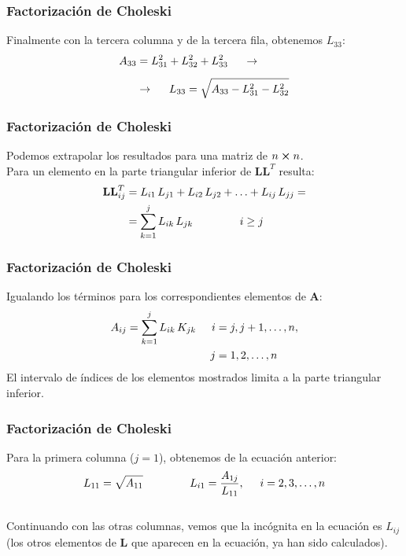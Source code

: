 \begin{frame}
\frametitle{Factorización de Choleski}
Finalmente con la tercera columna y de la tercera fila, obtenemos $L_{33}$:
\begin{align*}
A_{33} &= L_{31}^{2} + L_{32}^{2} + L_{33}^{2} \hspace{0.5cm} \rightarrow \\[0.5em]
&\rightarrow \hspace{0.5cm} L_{33} =\sqrt{A_{33} - L_{31}^{2} - L_{32}^{2}}
\end{align*}
\end{frame}
\begin{frame}
\frametitle{Factorización de Choleski}
Podemos extrapolar los resultados para una matriz de $n \cp n$.
\\
\bigskip
\pause
Para un elemento en la parte triangular inferior de $\mathbf{LL}^{T}$ resulta:
\begin{align*}
\mathbf{LL}^{T}_{ij} &= L_{i1} \, L_{j1} + L_{i2} \, L_{j2} + \ldots + L_{ij} \, L_{jj} = \\
&= \sum_{k=1}^{j} L_{ik}\, L_{jk} \hspace{1.5cm} i \geq j
\end{align*}
\end{frame}
\begin{frame}
\frametitle{Factorización de Choleski}
Igualando los términos para los correspondientes elementos de $\mathbf{A}$:
\begin{align*}
A_{ij} = \sum_{k=1}^{j} L_{ik} \, K_{jk} \hspace{0.5cm} i &= j, j+1,\ldots, n, \\
j &= 1, 2, \ldots, n
\end{align*}
El intervalo de índices de los elementos mostrados limita a la parte triangular inferior. 
\end{frame}
\begin{frame}
\frametitle{Factorización de Choleski}
Para la primera columna ($j = 1$), obtenemos de la ecuación anterior:
\begin{align*}
L_{11} = \sqrt{A_{11}} \hspace{1.5cm} L_{i1} = \dfrac{A_{1j}}{L_{11}}, \hspace{0.5cm} i = 2, 3, \ldots, n
\end{align*}
\\
\bigskip
Continuando con las otras columnas, vemos que la incógnita en la ecuación es $L_{ij}$ (los otros elementos de $\mathbf{L}$ que aparecen en la ecuación, ya han sido calculados). 
\end{frame}
